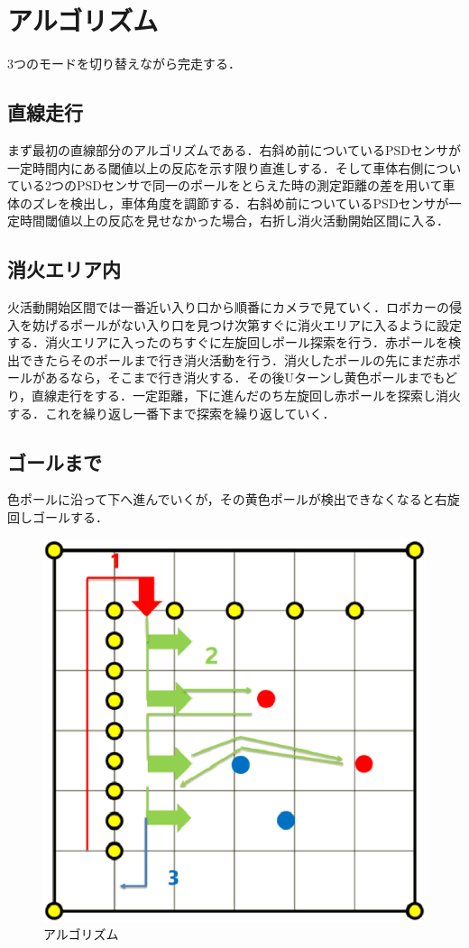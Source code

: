\documentclass[10pt,a4j]{jarticle}
\begin{document}
\newpage

\section{アルゴリズム}
3つのモードを切り替えながら完走する．
 \subsection{直線走行}
 まず最初の直線部分のアルゴリズムである．右斜め前についているPSDセンサが一定時間内にある閾値以上の反応を示す限り直進しする．そして車体右側についている2つのPSDセンサで同一のポールをとらえた時の測定距離の差を用いて車体のズレを検出し，車体角度を調節する．右斜め前についているPSDセンサが一定時間閾値以上の反応を見せなかった場合，右折し消火活動開始区間に入る．
 \subsection{消火エリア内}
火活動開始区間では一番近い入り口から順番にカメラで見ていく．ロボカーの侵入を妨げるポールがない入り口を見つけ次第すぐに消火エリアに入るように設定する．消火エリアに入ったのちすぐに左旋回しポール探索を行う．赤ポールを検出できたらそのポールまで行き消火活動を行う．消火したポールの先にまだ赤ポールがあるなら，そこまで行き消火する．その後Uターンし黄色ポールまでもどり，直線走行をする．一定距離，下に進んだのち左旋回し赤ポールを探索し消火する．これを繰り返し一番下まで探索を繰り返していく．
 \subsection{ゴールまで} 
色ポールに沿って下へ進んでいくが，その黄色ポールが検出できなくなると右旋回しゴールする．


\begin{figure}[hb]
\begin{center}
  \includegraphics[scale = 0.4]{./picture/screen_shot.eps}
 \caption{アルゴリズム}
\end{center}
\end{figure}
\end{document}
